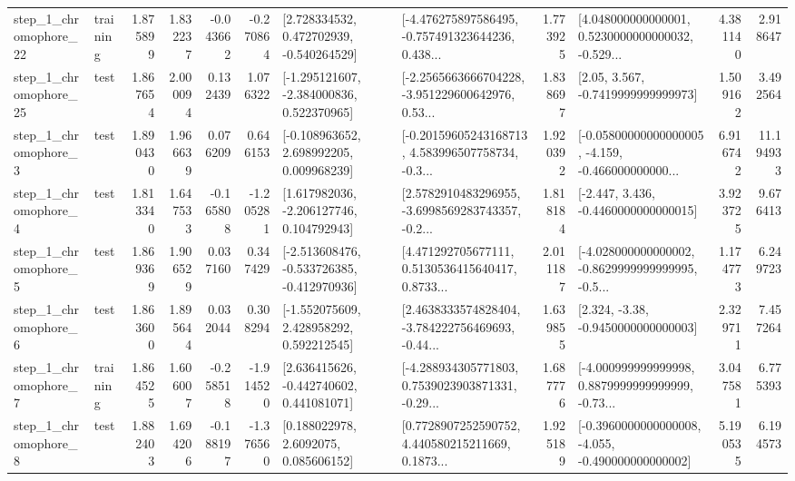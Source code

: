 \begin{tabular}{llrrrrllrlrr}
    step\_1\_chromophore\_22 &  training &      1.875899 &    1.832237 &     -0.043662 & -0.270864 &    [2.728334532, 0.472702939, -0.540264529] &  [-4.476275897586495, -0.757491323644236, 0.438... &       1.773925 &  [4.048000000000001, 0.5230000000000032, -0.529... &            4.381140 &          2.918647 \\
    step\_1\_chromophore\_25 &      test &      1.867654 &    2.000094 &      0.132439 &  1.076322 &   [-1.295121607, -2.384000836, 0.522370965] &  [-2.2565663666704228, -3.951229600642976, 0.53... &       1.838697 &                 [2.05, 3.567, -0.7419999999999973] &            1.509162 &          3.492564 \\
     step\_1\_chromophore\_3 &      test &      1.890430 &    1.966639 &      0.076209 &  0.646153 &    [-0.108963652, 2.698992205, 0.009968239] &  [-0.20159605243168713, 4.583996507758734, -0.3... &       1.920392 &  [-0.05800000000000005, -4.159, -0.466000000000... &            6.916742 &         11.194933 \\
     step\_1\_chromophore\_4 &      test &      1.813340 &    1.647533 &     -0.165808 & -1.205281 &    [1.617982036, -2.206127746, 0.104792943] &  [2.5782910483296955, -3.6998569283743357, -0.2... &       1.818184 &               [-2.447, 3.436, -0.4460000000000015] &            3.923725 &          9.676413 \\
     step\_1\_chromophore\_5 &      test &      1.869369 &    1.906529 &      0.037160 &  0.347429 &  [-2.513608476, -0.533726385, -0.412970936] &  [4.471292705677111, 0.5130536415640417, 0.8733... &       2.011187 &  [-4.028000000000002, -0.8629999999999995, -0.5... &            1.174773 &          6.249723 \\
     step\_1\_chromophore\_6 &      test &      1.863600 &    1.895644 &      0.032044 &  0.308294 &    [-1.552075609, 2.428958292, 0.592212545] &  [2.4638333574828404, -3.784222756469693, -0.44... &       1.639855 &                [2.324, -3.38, -0.9450000000000003] &            2.329711 &          7.457264 \\
     step\_1\_chromophore\_7 &  training &      1.864525 &    1.606007 &     -0.258518 & -1.914520 &    [2.636415626, -0.442740602, 0.441081071] &  [-4.288934305771803, 0.7539023903871331, -0.29... &       1.687776 &  [-4.000999999999998, 0.8879999999999999, -0.73... &            3.047581 &          6.775393 \\
     step\_1\_chromophore\_8 &      test &      1.882403 &    1.694206 &     -0.188197 & -1.376560 &       [0.188022978, 2.6092075, 0.085606152] &  [0.7728907252590752, 4.440580215211669, 0.1873... &       1.925189 &  [-0.3960000000000008, -4.055, -0.490000000000002] &            5.190535 &          6.194573 \\

\end{tabular}
